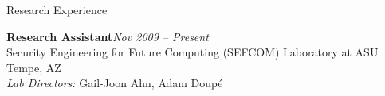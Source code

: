 \begin{rSection}{Research Experience}

  \textbf{Research Assistant}\hfill \emph{Nov 2009 -- Present}\\
  Security Engineering for Future Computing (SEFCOM) Laboratory at ASU \hfill {Tempe, AZ}\\
  \emph{Lab Directors:} Gail-Joon Ahn, Adam Doup\'{e}


\end{rSection}
